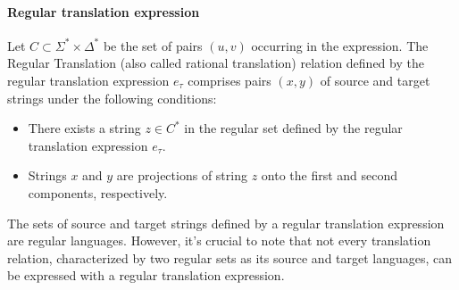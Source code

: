 \paragraph*{Regular translation expression}
Let $C \subset \Sigma^{*} \times \Delta^{*}$  be the set of pairs $\left( u, v \right)$ occurring in the expression. The Regular Translation (also called rational translation) relation defined by the regular translation expression $e_\tau$ comprises pairs $\left( x, y \right)$ of source and target strings under the following conditions:
\begin{itemize}
    \item There exists a string $z \in C^{*}$ in the regular set defined by the regular translation expression $e_\tau$.
    \item Strings $x$ and $y$ are projections of string $z$ onto the first and second components, respectively.
\end{itemize}
The sets of source and target strings defined by a regular translation expression are regular languages. However, it's crucial to note that not every translation relation, characterized by two regular sets as its source and target languages, can be expressed with a regular translation expression.

